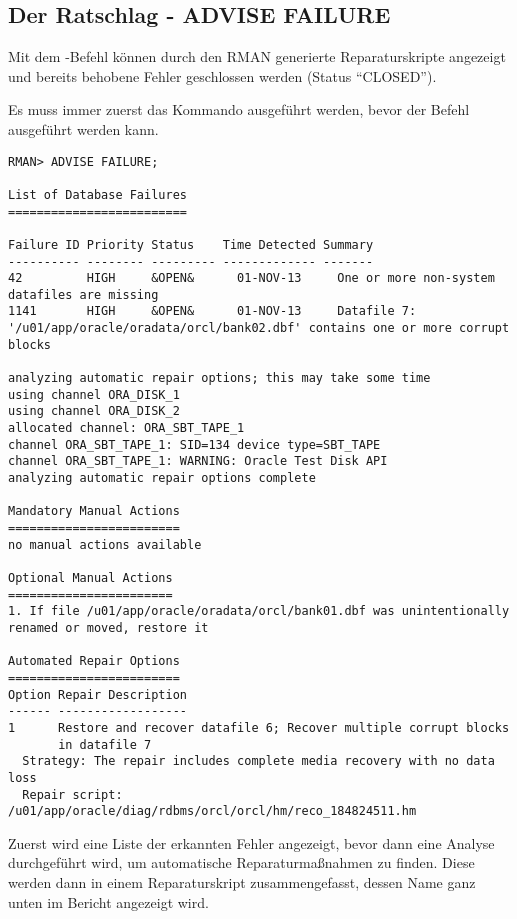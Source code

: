       \subsection{Der Ratschlag - ADVISE FAILURE}
        Mit dem -Befehl können durch den RMAN generierte Reparaturskripte angezeigt und bereits behobene Fehler geschlossen werden (Status \enquote{CLOSED}).
        \begin{merke}
          Es muss immer zuerst das Kommando  ausgeführt werden, bevor der Befehl  ausgeführt werden kann.
        \end{merke}

        \begin{lstlisting}[caption={Das Kommando \languagerman{ADVISE FAILURE}},label=admin1539,language=rman]
RMAN> ADVISE FAILURE;

List of Database Failures
=========================

Failure ID Priority Status    Time Detected Summary
---------- -------- --------- ------------- -------
42         HIGH     &OPEN&      01-NOV-13     One or more non-system
datafiles are missing
1141       HIGH     &OPEN&      01-NOV-13     Datafile 7:
'/u01/app/oracle/oradata/orcl/bank02.dbf' contains one or more corrupt blocks

analyzing automatic repair options; this may take some time
using channel ORA_DISK_1
using channel ORA_DISK_2
allocated channel: ORA_SBT_TAPE_1
channel ORA_SBT_TAPE_1: SID=134 device type=SBT_TAPE
channel ORA_SBT_TAPE_1: WARNING: Oracle Test Disk API
analyzing automatic repair options complete

Mandatory Manual Actions
========================
no manual actions available

Optional Manual Actions
=======================
1. If file /u01/app/oracle/oradata/orcl/bank01.dbf was unintentionally
renamed or moved, restore it

Automated Repair Options
========================
Option Repair Description
------ ------------------
1      Restore and recover datafile 6; Recover multiple corrupt blocks
       in datafile 7
  Strategy: The repair includes complete media recovery with no data loss
  Repair script: /u01/app/oracle/diag/rdbms/orcl/orcl/hm/reco_184824511.hm
        \end{lstlisting}
        Zuerst wird eine Liste der erkannten Fehler angezeigt, bevor dann eine Analyse durchgeführt wird, um automatische Reparaturmaßnahmen zu finden. Diese werden dann in einem Reparaturskript zusammengefasst, dessen Name ganz unten im Bericht angezeigt wird.
